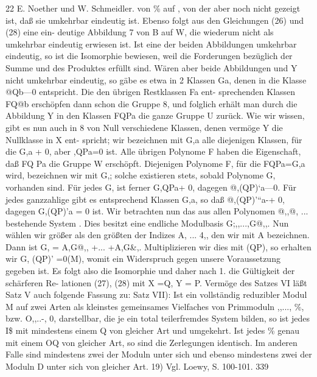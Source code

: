 \documentclass[11pt,a4paper]{article}
\theoremstyle{plain}
\theoremstyle{definition}
\begin{document}
22 
E. Noether und W. Schmeidler. 
von \% auf , von der aber noch nicht gezeigt 
ist, daß 
sie umkehrbar 
eindeutig ist. 
Ebenso folgt aus den Gleichungen (26) und (28) eine ein- 
deutige Abbildung 7 von B auf W, die wiederum 
nicht als umkehrbar 
eindeutig erwiesen ist. 
Ist eine der beiden Abbildungen umkehrbar 
eindeutig, 
so 
ist die 
Isomorphie bewiesen, weil die Forderungen bezüglich der Summe und des 
Produktes erfüllt sind. 
Wären 
aber beide Abbildungen  und Y nicht 
umkehrbar eindeutig, so gäbe es etwa in 2 Klassen Ga, denen in  die 
Klasse @Qb---0 
entspricht. 
Die 
den 
übrigen Restklassen Fa 
ent- 
sprechenden Klassen FQ@b erschöpfen dann schon 
die Gruppe 8, und 
folglich erhält man 
durch die Abbildung Y in den Klassen 
FQPa 
die 
ganze Gruppe U zurück. 
Wie wir wissen, 
gibt es nun auch 
in 8 von 
Null verschiedene Klassen, 
denen vermöge Y die Nullklasse 
in X ent- 
spricht; wir bezeichnen mit G,a alle diejenigen Klassen, für die G,a + 0, 
aber ,QPa=0 
ist. 
Alle übrigen Polynome F haben die Eigenschaft, 
daß 
FQ Pa 
die Gruppe W erschöpft. 
Diejenigen Polynome F, für die 
FQPa=G,a wird, bezeichnen wir mit G,; solche existieren stets, sobald 
Polynome G, vorhanden 
sind. 
Für 
jedes G, ist ferner G,QPa+ 
0, 
dagegen @,(QP)`a---0. 
Für jedes ganzzahlige \guillemotright{} gibt es entsprechend 
Klassen G,a, so daß @,(QP)'``a-+ 0, dagegen G,(QP)'a = 0 ist. 
Wir betrachten nun das aus allen Polynomen @,,@, ... bestehende 
System . 
Dies 
besitzt 
eine endliche Modulbasis 
G;,,...,G@,,. 
Nun 
wählen wir \guillemotright{} größer als den größten der Indizes A, ... 4,, den wir mit 
A bezeichnen. 
Dann ist 
G, = A,G@,, +... 
+A,G\&,. 
Multiplizieren wir dies mit (QP), so erhalten wir 
G, (QP)' =0(M), 
womit ein Widerspruch gegen unsere Voraussetzung gegeben ist. Es folgt 
also die Isomorphie und daher nach 1. die Gültigkeit der schärferen Re- 
lationen (27), (28) mit 
X =Q, Y = P. 
Vermöge des Satzes VI läßt Satz V auch folgende Fassung zu: 
Satz VII): Ist ein vollständig reduzibler Modul M auf zwei Arten 
als kleinstes gemeinsames Vielfaches von Primmoduln ,,..., \%, bzw. 
O,,..-, 0, darstellbar, die je ein total teilerfremdes System bilden, so 
ist jedes I\$ mit mindestens einem Q von gleicher Art und umgekehrt. 
Ist jedes \% genau mit einem OQ von gleicher Art, so sind die Zerlegungen 
identisch. 
Im anderen Falle sind mindestens zwei der Moduln  unter 
sich und ebenso mindestens zwei der Moduln D unter sich von gleicher Art. 
19) Vgl. Loewy, S. 100-101. 
339
\end{document}
